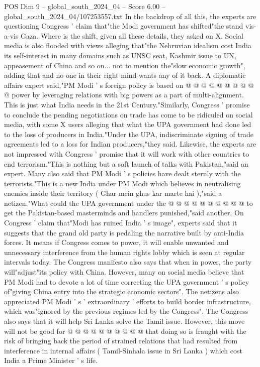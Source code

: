 \begin{textsample}{POS Dim 9 – global\_south\_2024\_04 – Score 6.00 – global\_south\_2024\_04/107253557.txt}
In the backdrop of all this, the experts are questioning Congress ' claim that"the Modi government has shifted"the stand vis-a-vis Gaza.
Where is the shift, given all these details, they asked on X.
Social media is also flooded with views alleging that"the Nehruvian idealism cost India its self-interest in many domains such as UNSC seat, Kashmir issue to UN, appeasement of China and so on... not to mention the"slow economic growth", adding that and no one in their right mind wants any of it back.
A diplomatic affairs expert said,"PM Modi ' s foreign policy is based on @ @ @ @ @ @ @ @ @ @ power by leveraging relations with big powers as a part of multi-alignment.
This is just what India needs in the 21st Century."Similarly, Congress ' promise to conclude the pending negotiations on trade has come to be ridiculed on social media, with some X users alleging that what the UPA government had done led to the loss of producers in India."Under the UPA, indiscriminate signing of trade agreements led to a loss for Indian producers,"they said.
Likewise, the experts are not impressed with Congress ' promise that it will work with other countries to end terrorism."This is nothing but a soft launch of talks with Pakistan,"said an expert.
Many also said that PM Modi ' s policies have dealt sternly with the terrorists."This is a new India under PM Modi which believes in neutralising enemies inside their territory ( Ghar mein ghus kar marte hai ),"said a netizen."What could the UPA government under the @ @ @ @ @ @ @ @ @ @ to get the Pakistan-based masterminds and handlers punished,"said another.
On Congress ' claim that"Modi has ruined India ' s image", experts said that it suggests that the grand old party is pedaling the narrative built by anti-India forces.
It means if Congress comes to power, it will enable unwanted and unnecessary interference from the human rights lobby which is seen at regular intervals today.
The Congress manifesto also says that when in power, the party will"adjust"its policy with China.
However, many on social media believe that PM Modi had to devote a lot of time correcting the UPA government ' s policy of"giving China entry into the strategic economic sectors".
The netizens also appreciated PM Modi ' s ' extraordinary ' efforts to build border infrastructure, which was"ignored by the previous regimes led by the Congress".
The Congress also says that it will help Sri Lanka solve the Tamil issue.
However, this move will not be good for @ @ @ @ @ @ @ @ @ @ that doing so is fraught with the risk of bringing back the period of strained relations that had resulted from interference in internal affairs ( Tamil-Sinhala issue in Sri Lanka ) which cost India a Prime Minister ' s life.

\end{textsample}
